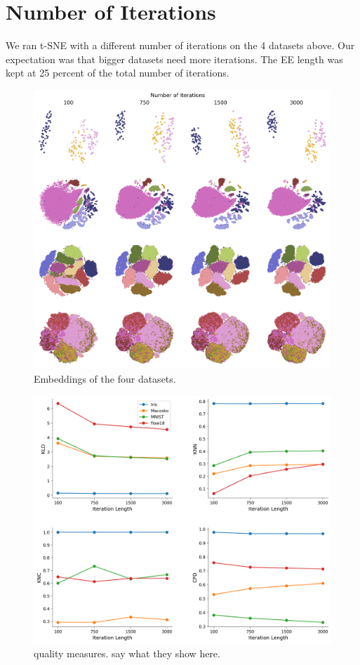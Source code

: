 \section{Number of Iterations}
We ran t-SNE with a different number of iterations on the 4 datasets above. Our expectation was that bigger datasets need more iterations. The EE length was kept at 25 percent of the total number of iterations. 

\begin{figure}[h]
    \centering 
        \includegraphics[width=\linewidth]{figures/n_iter/n_iter_embedding_grid_tab20b.png}
        \caption{Embeddings of the four datasets.}
    \label{fig:n_iter-grid}
\end{figure}

\begin{figure}[h]
    \centering 
        \includegraphics[width=\linewidth]{figures/n_iter/n_iter_4_quality_measures.png}
        \caption{quality measures. say what they show here.}
    \label{fig:n_iter-quality}
\end{figure}

